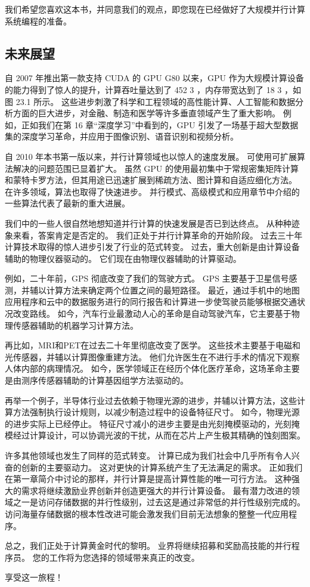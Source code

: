 我们希望您喜欢这本书，并同意我们的观点，即您现在已经做好了大规模并行计算系统编程的准备。

\subsection{未来展望}
自 2007 年推出第一款支持 CUDA 的 GPU G80 以来，GPU 作为大规模计算设备的能力得到了惊人的提升，计算吞吐量达到了 452 3 ，内存带宽达到了 18 3 ，如图 23.1 所示。 这些进步刺激了科学和工程领域的高性能计算、人工智能和数据分析方面的巨大进步，对金融、制造和医学等许多垂直领域产生了重大影响。 例如，正如我们在第 16 章“深度学习”中看到的，GPU 引发了一场基于超大型数据集的深度学习革命，并应用于图像识别、语音识别和视频分析。

自 2010 年本书第一版以来，并行计算领域也以惊人的速度发展。 可使用可扩展算法解决的问题范围已显着扩大。 虽然 GPU 的使用最初集中于常规密集矩阵计算和蒙特卡罗方法，但其用途已迅速扩展到稀疏方法、图计算和自适应细化方法。 在许多领域，算法也取得了快速进步。 并行模式、高级模式和应用章节中介绍的一些算法代表了最新的重大进展。

我们中的一些人很自然地想知道并行计算的快速发展是否已到达终点。 从种种迹象来看，答案肯定是否定的。 我们正处于并行计算革命的开始阶段。 过去三十年计算技术取得的惊人进步引发了行业的范式转变。 过去，重大创新是由计算设备辅助的物理仪器驱动的。 它们现在由物理仪器辅助的计算驱动。

例如，二十年前，GPS 彻底改变了我们的驾驶方式。 GPS 主要基于卫星信号感测，并辅以计算方法来确定两个位置之间的最短路径。 最近，通过手机中的地图应用程序和云中的数据服务进行的同行报告和计算进一步使驾驶员能够根据交通状况改变路线。 如今，汽车行业最激动人心的革命是自动驾驶汽车，它主要基于物理传感器辅助的机器学习计算方法。

再比如，MRI和PET在过去二十年里彻底改变了医学。 这些技术主要基于电磁和光传感器，并辅以计算图像重建方法。 他们允许医生在不进行手术的情况下观察人体内部的病理情况。 如今，医学领域正在经历个体化医疗革命，这场革命主要是由测序传感器辅助的计算基因组学方法驱动的。

再举一个例子，半导体行业过去依赖于物理光源的进步，并辅以计算方法，这些计算方法强制执行设计规则，以减少制造过程中的设备特征尺寸。 如今，物理光源的进步实际上已经停止。 特征尺寸减小的进步主要是由光刻掩模驱动的，光刻掩模经过计算设计，可以协调光波的干扰，从而在芯片上产生极其精确的蚀刻图案。

许多其他领域也发生了同样的范式转变。 计算已成为我们社会中几乎所有令人兴奋的创新的主要驱动力。 这对更快的计算系统产生了无法满足的需求。 正如我们在第一章简介中讨论的那样，并行计算是提高计算性能的唯一可行方法。 这种强大的需求将继续激励业界创新并创造更强大的并行计算设备。 最有潜力改进的领域之一是访问存储数据的并行性级别，过去这是通过非常低的并行性级别完成的。 访问海量存储数据的根本性改进可能会激发我们目前无法想象的整整一代应用程序。

总之，我们正处于计算黄金时代的黎明。 业界将继续招募和奖励高技能的并行程序员。 您的工作将为您选择的领域带来真正的改变。

享受这一旅程！